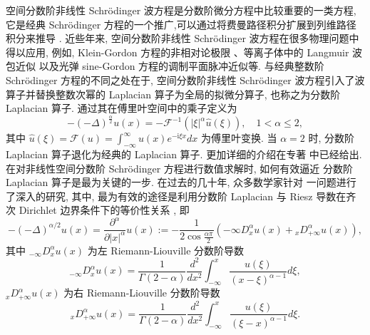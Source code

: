 空间分数阶非线性 Schr{\"o}dinger 波方程是分数阶微分方程中比较重要的一类方程, 它是经典 Schr{\"o}dinger 方程的一个推广,可以通过将费曼路径积分扩展到列维路径积分来推导 \cite{laskinFractionalQuantumMechanics2000,laskinFractionalSchrodingerEquation2002}. 
近些年来, 空间分数阶非线性 Schr{\"o}dinger 波方程在很多物理问题中得以应用, 例如, Klein-Gordon 方程的非相对论极限 \cite{tsutsumiNonrelativisticApproximationNonlinear1984,machiharaNonrelativisticLimitEnergy2002}、等离子体中的 Langmuir 波包近似 \cite{colinSemidiscretizationTimeNonlinear1998} 以及光弹 sine-Gordon 方程的调制平面脉冲近似\cite{baoComparisonsSineGordonPerturbed2010,xinModelingLightBullets2000}等. 
与经典整数阶 Schr{\"o}dinger 方程的不同之处在于, 空间分数阶非线性 Schr{\"o}dinger 波方程引入了波算子并替换整数次幂的 Laplacian 算子为全局的拟微分算子, 也称之为分数阶 Laplacian 算子. 通过其在傅里叶空间中的乘子定义为 \cite{caffarelliExtensionProblemRelated2007}
\begin{equation}
    -(-\Delta)^{\frac{\alpha}{2}} u(x)=-\mathcal{F}^{-1}\left(|\xi|^\alpha \hat{u}(\xi)\right), \quad 1<\alpha \leq 2,
    \end{equation}
其中 $\hat{u}(\xi)=\mathcal{F}(u)=\int_{-\infty}^{\infty} u(x) e^{-\mathrm{i} \xi x} d x$ 为傅里叶变换. 当 $\alpha=2$ 时, 分数阶 Laplacian 算子退化为经典的 Laplacian 算子. 更加详细的介绍在专著 \cite{zhangConservativeNumericalScheme2003,baoUniformErrorEstimates2012,chengSeveralConservativeCompact2018,brugnanoClassEnergyconservingHamiltonian2018} 中已经给出.
在对非线性空间分数阶 Schr{\"o}dinger 方程进行数值求解时, 如何有效逼近 分数阶 Laplacian 算子是最为关键的一步. 在过去的几十年, 众多数学家针对 一问题进行了深入的研究, 其中, 最为有效的途径是利用分数阶 Laplacian 与 Riesz 导数在齐次 Dirichlet 边界条件下的等价性关系 \cite{yangNumericalMethodsFractional2010,demengelFunctionalSpacesTheory2012}, 即
\begin{equation}
-(-\Delta)^{\alpha / 2} u(x)=\frac{\partial^\alpha}{\partial|x|^\alpha} u(x):=-\frac{1}{2 \cos \frac{\alpha \pi}{2}}\left(-\infty D_x^\alpha u(x)+{ }_x D_{+\infty}^\alpha u(x)\right),
\end{equation}
其中 ${ }_{-\infty} D_x^\alpha u(x)$ 为左 Riemann-Liouville 分数阶导数
\begin{equation}
{ }_{-\infty} D_x^\alpha u(x)=\frac{1}{\Gamma(2-\alpha)} \frac{d^2}{d x^2} \int_{-\infty}^x \frac{u(\xi)}{(x-\xi)^{\alpha-1}} d \xi,
\end{equation}
${ }_x D_{+\infty}^\alpha u(x)$ 为右 Riemann-Liouville 分数阶导数
\begin{equation}
{ }_x D_{+\infty}^\alpha u(x)=\frac{1}{\Gamma(2-\alpha)} \frac{d^2}{d x^2} \int_{-\infty}^x \frac{u(\xi)}{(\xi-x)^{\alpha-1}} d \xi .
\end{equation}
